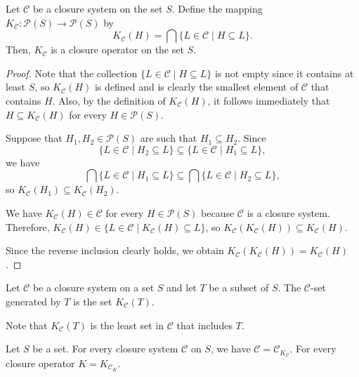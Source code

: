 \documentclass[../main.tex]{subfiles}
\begin{document}
\begin{yellow}
\begin{theorem}
    
Let $\mathcal{C}$ be a closure system on the set $S$. Define the mapping $K_{\mathcal{C}}: \mathcal{P}(S) \longrightarrow \mathcal{P}(S)$ by
$$
K_{\mathcal{C}}(H) = \bigcap \{ L \in \mathcal{C} \mid H \subseteq L \}.
$$
Then, $K_{\mathcal{C}}$ is a closure operator on the set $S$.


\end{theorem}
\end{yellow}


\begin{proof}
Note that the collection $\{L \in \mathcal{C} \mid H \subseteq L\}$ is not empty since it contains at least $S$, so $K_{\mathcal{C}}(H)$ is defined and is clearly the smallest element of $\mathcal{C}$ that contains $H$. Also, by the definition of $K_{\mathcal{C}}(H)$, it follows immediately that $H \subseteq K_{\mathcal{C}}(H)$ for every $H \in \mathcal{P}(S)$.

Suppose that $H_{1}, H_{2} \in \mathcal{P}(S)$ are such that $H_{1} \subseteq H_{2}$. Since
$$
\{L \in \mathcal{C} \mid H_{2} \subseteq L\} \subseteq \{L \in \mathcal{C} \mid H_{1} \subseteq L\},
$$
we have
$$
\bigcap \{L \in \mathcal{C} \mid H_{1} \subseteq L\} \subseteq \bigcap \{L \in \mathcal{C} \mid H_{2} \subseteq L\},
$$
so $K_{\mathcal{C}}(H_{1}) \subseteq K_{\mathcal{C}}(H_{2})$.

We have $K_{\mathcal{C}}(H) \in \mathcal{C}$ for every $H \in \mathcal{P}(S)$ because $\mathcal{C}$ is a closure system. Therefore, $K_{\mathcal{C}}(H) \in \{L \in \mathcal{C} \mid K_{\mathcal{C}}(H) \subseteq L\}$, so $K_{\mathcal{C}}(K_{\mathcal{C}}(H)) \subseteq K_{\mathcal{C}}(H)$.

Since the reverse inclusion clearly holds, we obtain $K_{\mathcal{C}}(K_{\mathcal{C}}(H)) = K_{\mathcal{C}}(H)$.
\end{proof}

\begin{purple}
\begin{definition}
Let $\mathcal{C}$ be a closure system on a set $S$ and let $T$ be a subset of $S$. The $\mathcal{C}$-set generated by $T$ is the set $K_{\mathcal{C}}(T)$.
\end{definition}
\end{purple}
Note that $K_{\mathcal{C}}(T)$ is the least set in $\mathcal{C}$ that includes $T$.

\begin{yellow}
\begin{theorem}

Let $S$ be a set. For every closure system $\mathcal{C}$ on $S$, we have $\mathcal{C}=\mathcal{C}_{K_{\mathcal{C}}}$. For every closure operator $K=K_{\mathcal{C}_K}$.

\end{theorem}
\end{yellow}
\end{document}
